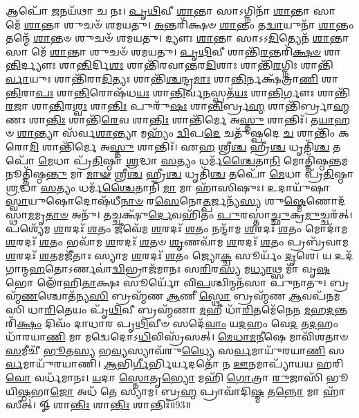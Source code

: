 𑌆𑌪𑍋᳴ \ul{𑌜}\-𑌨𑌯᳴𑌥𑌾 𑌚 𑌨𑌃। 
\-\ul{𑌪𑍃}\-\-\ul{𑌥𑌿}\-𑌵𑍀 \ul{𑌶𑌾}\-𑌨𑍍𑌤𑌾 𑌸𑌾𑌽𑌗𑍍𑌨𑌿𑌨𑌾᳴ \ul{𑌶𑌾}\-𑌨𑍍𑌤𑌾 𑌸𑌾 𑌮𑍇᳴ \ul{𑌶𑌾}\-𑌨𑍍𑌤𑌾 𑌶𑍁𑌚𑍞᳴ 𑌶𑌮𑌯𑌤𑍁। 
\-\ul{𑌅}\-𑌨𑍍𑌤𑌰𑌿᳴𑌕𑍍𑌷𑍞 \ul{𑌶𑌾}\-𑌨𑍍𑌤𑌂 𑌤\-\ul{𑌦𑍍𑌵𑌾}\-𑌯𑍁𑌨𑌾᳴ \ul{𑌶𑌾}\-𑌨𑍍𑌤𑌂 𑌤𑌨𑍍𑌮𑍇᳴ \ul{𑌶𑌾}\-𑌨𑍍𑌤𑍞 𑌶𑍁𑌚𑍞᳴ 𑌶𑌮𑌯𑌤𑍁। 
𑌦𑍍𑌯𑍗𑌃  \ul{𑌶𑌾}\-𑌨𑍍𑌤𑌾 𑌸𑌾𑌽𑌽\-\ul{𑌦𑌿}\-𑌤𑍍𑌯𑍇𑌨᳴ \ul{𑌶𑌾}\-𑌨𑍍𑌤𑌾 𑌸𑌾 𑌮𑍇᳴ \ul{𑌶𑌾}\-𑌨𑍍𑌤𑌾 𑌶𑍁𑌚𑍞᳴ 𑌶𑌮𑌯𑌤𑍁। 
\-\ul{𑌪𑍃}\-\-\ul{𑌥𑌿}\-𑌵𑍀 𑌶𑌾𑌨𑍍𑌤𑌿᳴\-\ul{𑌰}\-𑌨𑍍𑌤𑌰𑌿᳴\-\ul{𑌕𑍍𑌷}\-\-\ul{𑍞} 𑌶𑌾\-\ul{𑌨𑍍𑌤𑌿}\-𑌰𑍍𑌦𑍍𑌯𑍗𑌃  𑌶𑌾\-\ul{𑌨𑍍𑌤𑌿}\-𑌰𑍍𑌦𑌿\-\ul{𑌶𑌃} 𑌶𑌾𑌨𑍍𑌤𑌿᳴𑌰𑌵𑌾𑌨𑍍𑌤𑌰\-\ul{𑌦𑌿}\-𑌶𑌾𑌃  𑌶𑌾𑌨𑍍𑌤𑌿᳴\-\ul{𑌰}\-𑌗𑍍𑌨𑌿𑌃  𑌶𑌾𑌨𑍍𑌤𑌿᳴\-\ul{𑌰𑍍𑌵𑌾}\-𑌯𑍁𑌃  𑌶𑌾𑌨𑍍𑌤𑌿᳴𑌰𑌾\-\ul{𑌦𑌿}\-𑌤𑍍𑌯𑌃  𑌶𑌾𑌨𑍍𑌤𑌿᳴\-\ul{𑌶𑍍𑌚}\-𑌨𑍍𑌦𑍍𑌰\-\ul{𑌮𑌾𑌃} 𑌶𑌾\-\ul{𑌨𑍍𑌤𑌿}\-𑌰𑍍𑌨𑌕𑍍𑌷᳴𑌤𑍍𑌰𑌾\-\ul{𑌣𑌿} 𑌶𑌾\-\ul{𑌨𑍍𑌤𑌿}\-𑌰𑌾\-\ul{𑌪𑌃} 𑌶𑌾\-\ul{𑌨𑍍𑌤𑌿}\-𑌰𑍋𑌷᳴𑌧\-\ul{𑌯𑌃} 𑌶𑌾\-\ul{𑌨𑍍𑌤𑌿}\-𑌰𑍍𑌵\-\ul{𑌨}\-𑌸𑍍𑌪𑌤᳴\-\ul{𑌯𑌃} 𑌶𑌾\-\ul{𑌨𑍍𑌤𑌿}\-𑌰𑍍𑌗𑍗𑌃  𑌶𑌾𑌨𑍍𑌤𑌿᳴\-\ul{𑌰}\-𑌜𑌾 𑌶𑌾\-\ul{𑌨𑍍𑌤𑌿}\-𑌰\-\ul{𑌶𑍍𑌵𑌃} 𑌶𑌾\-\ul{𑌨𑍍𑌤𑌿𑌃} 𑌪𑍁𑌰𑍁᳴\-\ul{𑌷𑌃} 𑌶𑌾\-\ul{𑌨𑍍𑌤𑌿}\-𑌰𑍍𑌬𑍍𑌰\-\ul{𑌹𑍍𑌮} 𑌶𑌾𑌨𑍍𑌤𑌿᳴𑌰𑍍𑌬𑍍𑌰𑌾\-\ul{𑌹𑍍𑌮}\-𑌣𑌃  𑌶𑌾\-\ul{𑌨𑍍𑌤𑌿𑌃} 𑌶𑌾𑌨𑍍𑌤𑌿᳴\-\ul{𑌰𑍇}\-𑌵 𑌶𑌾\-\ul{𑌨𑍍𑌤𑌿𑌃} 𑌶𑌾𑌨𑍍𑌤𑌿᳴𑌰𑍍𑌮𑍇 𑌅\-\ul{𑌸𑍍𑌤𑍁} 𑌶𑌾𑌨𑍍𑌤𑌿𑌃᳴। 
𑌤\-\ul{𑌯𑌾}\-𑌹𑍞 \ul{𑌶𑌾}\-𑌨𑍍𑌤𑍍𑌯𑌾 𑌸᳴𑌰𑍍𑌵\-\ul{𑌶𑌾}\-𑌨𑍍𑌤𑍍𑌯𑌾 𑌮𑌹𑍍𑌯𑌂᳴ \ul{𑌦𑍍𑌵𑌿}\-𑌪\-\ul{𑌦𑍇} 𑌚𑌤𑍁᳴𑌷𑍍𑌪𑌦𑍇 \ul{𑌚} 𑌶𑌾𑌨𑍍𑌤𑌿𑌂᳴ 𑌕𑌰𑍋\-\ul{𑌮𑌿} 𑌶𑌾𑌨𑍍𑌤𑌿᳴𑌰𑍍𑌮𑍇 𑌅\-\ul{𑌸𑍍𑌤𑍁} 𑌶𑌾𑌨𑍍𑌤𑌿𑌃᳴। 
𑌏\-\ul{𑌹} 𑌶𑍍𑌰𑍀\-\ul{𑌶𑍍𑌚} 𑌹𑍍𑌰𑍀\-\ul{𑌶𑍍𑌚} 𑌧𑍃𑌤𑌿᳴\-\ul{𑌶𑍍𑌚} 𑌤𑌪𑍋᳴ \ul{𑌮𑍇}\-𑌧𑌾 𑌪𑍍𑌰᳴\-\ul{𑌤𑌿}\-𑌷𑍍𑌠𑌾 \ul{𑌶𑍍𑌰}\-𑌦𑍍𑌧𑌾 \ul{𑌸}\-𑌤𑍍𑌯𑌂 𑌧𑌰𑍍𑌮᳴\-\ul{𑌶𑍍𑌚𑍈}\-𑌤𑌾\-\ul{𑌨𑌿} 𑌮𑍋𑌤𑍍𑌤𑌿᳴𑌷𑍍𑌠\-\ul{𑌨𑍍𑌤}\-𑌮𑌨𑍂𑌤𑍍𑌤𑌿᳴𑌷𑍍𑌠\-\ul{𑌨𑍍𑌤𑍁} 𑌮𑌾 \ul{𑌮𑌾}\-\-\ul{𑍟} 𑌶𑍍𑌰𑍀\-\ul{𑌶𑍍𑌚} 𑌹𑍍𑌰𑍀\-\ul{𑌶𑍍𑌚} 𑌧𑍃𑌤𑌿᳴\-\ul{𑌶𑍍𑌚} 𑌤𑌪𑍋᳴ \ul{𑌮𑍇}\-𑌧𑌾 𑌪𑍍𑌰᳴\-\ul{𑌤𑌿}\-𑌷𑍍𑌠𑌾 \ul{𑌶𑍍𑌰}\-𑌦𑍍𑌧𑌾 \ul{𑌸}\-𑌤𑍍𑌯𑌂 𑌧𑌰𑍍𑌮᳴\-\ul{𑌶𑍍𑌚𑍈}\-𑌤𑌾𑌨𑌿᳴ \ul{𑌮𑌾} 𑌮𑌾 𑌹𑌾᳴𑌸𑌿𑌷𑍁𑌃। 
𑌉𑌦𑌾𑌯𑍁᳴𑌷𑌾 \ul{𑌸𑍍𑌵𑌾}\-𑌯𑍁𑌷𑍋𑌦𑍋𑌷᳴𑌧𑍀\-\ul{𑌨𑌾}\-\-\ul{𑍞} 𑌰\-\ul{𑌸𑍇}\-𑌨𑍋\-\ul{𑌤𑍍𑌪}\-𑌰𑍍𑌜𑌨𑍍𑌯᳴\-\ul{𑌸𑍍𑌯} 𑌶𑍁\-\ul{𑌷𑍍𑌮𑍇}\-𑌣𑍋𑌦᳴𑌸𑍍𑌥𑌾\-\ul{𑌮}\-𑌮𑍃\-\ul{𑌤𑌾}\-\-\ul{𑍞} 𑌅𑌨𑍁᳴। 
𑌤𑌚𑍍𑌚𑌕𑍍𑌷𑍁᳴\-\ul{𑌰𑍍𑌦𑍇}\-𑌵𑌹𑌿᳴𑌤𑌂 \ul{𑌪𑍁}\-𑌰𑌸𑍍𑌤𑌾॑\-\ul{𑌚𑍍𑌛𑍁}\-𑌕𑍍𑌰\-\ul{𑌮𑍁}\-𑌚𑍍𑌚𑌰᳴𑌤𑍍। 
𑌪𑌶𑍍𑌯𑍇᳴𑌮 \ul{𑌶}\-𑌰𑌦𑌃᳴ \ul{𑌶}\-𑌤𑌂 𑌜𑍀𑌵𑍇᳴𑌮 \ul{𑌶}\-𑌰𑌦𑌃᳴ \ul{𑌶}\-𑌤𑌂 𑌨𑌨𑍍𑌦𑌾᳴𑌮 \ul{𑌶}\-𑌰𑌦𑌃᳴ \ul{𑌶}\-𑌤𑌂 𑌮𑍋𑌦𑌾᳴𑌮 \ul{𑌶}\-𑌰𑌦𑌃᳴ \ul{𑌶}\-𑌤𑌂 𑌭𑌵𑌾᳴𑌮 \ul{𑌶}\-𑌰𑌦𑌃᳴ \ul{𑌶}\-𑌤𑍞 \ul{𑌶𑍃}\-𑌣𑌵𑌾᳴𑌮 \ul{𑌶}\-𑌰𑌦𑌃᳴ \ul{𑌶}\-𑌤𑌂 𑌪𑍍𑌰𑌬𑍍𑌰᳴𑌵𑌾𑌮 \ul{𑌶}\-𑌰𑌦𑌃᳴ \ul{𑌶}\-𑌤𑌮𑌜𑍀᳴𑌤𑌾𑌃 𑌸𑍍𑌯𑌾𑌮 \ul{𑌶}\-𑌰𑌦𑌃᳴ \ul{𑌶}\-𑌤𑌂 𑌜𑍍𑌯𑍋\-\ul{𑌕𑍍𑌚} 𑌸𑍂𑌰𑍍𑌯𑌂᳴ \ul{𑌦𑍃}\-𑌶𑍇। 
𑌯 𑌉𑌦᳴𑌗𑌾𑌨𑍍𑌮\-\ul{𑌹}\-𑌤𑍋𑌽𑌰𑍍𑌣𑌵𑌾॑\-\ul{𑌦𑍍𑌵𑌿}\-𑌭𑍍𑌰𑌾𑌜᳴𑌮𑌾𑌨𑌃 𑌸\-\ul{𑌰𑌿}\-𑌰\-\ul{𑌸𑍍𑌯} 𑌮\-\ul{𑌧𑍍𑌯𑌾}\-𑌥𑍍𑌸 𑌮𑌾᳴ 𑌵𑍃\-\ul{𑌷}\-𑌭𑍋 𑌲𑍋᳴𑌹𑌿\-\ul{𑌤𑌾}\-𑌕𑍍𑌷𑌃 𑌸𑍂𑌰𑍍𑌯𑍋᳴ 𑌵𑌿\-\ul{𑌪}\-𑌶𑍍𑌚𑌿𑌨𑍍𑌮𑌨᳴𑌸𑌾 𑌪𑍁𑌨𑌾𑌤𑍁। 
𑌬𑍍𑌰𑌹𑍍𑌮᳴\-\ul{𑌣}\-𑌶𑍍𑌚𑍋𑌤᳴𑌨𑍍𑌯\-\ul{𑌸𑌿} 𑌬𑍍𑌰𑌹𑍍𑌮᳴𑌣 \ul{𑌆}\-𑌣𑍀 \ul{𑌸𑍍𑌥𑍋} 𑌬𑍍𑌰𑌹𑍍𑌮᳴𑌣 \ul{𑌆}\-𑌵𑌪᳴𑌨𑌮𑌸𑌿 𑌧𑌾\-\ul{𑌰𑌿}\-𑌤𑍇𑌯𑌂 𑌪𑍃᳴\-\ul{𑌥𑌿}\-𑌵𑍀 𑌬𑍍𑌰𑌹𑍍𑌮᳴𑌣𑌾 \ul{𑌮}\-𑌹𑍀 𑌧𑌾᳴\-\ul{𑌰𑌿}\-𑌤𑌮𑍇᳴𑌨𑍇𑌨 \ul{𑌮}\-𑌹\-\ul{𑌦}\-𑌨𑍍𑌤𑌰𑌿᳴\-\ul{𑌕𑍍𑌷𑌂} 𑌦𑌿𑌵𑌂᳴ 𑌦𑌾𑌧𑌾𑌰 𑌪𑍃\-\ul{𑌥𑌿}\-𑌵𑍀𑍞 𑌸𑌦𑍇᳴\-\ul{𑌵𑌾𑌂} 𑌯\-\ul{𑌦}\-𑌹𑌂 𑌵𑍇\-\ul{𑌦} 𑌤\-\ul{𑌦}\-𑌹𑌂 𑌧𑌾᳴𑌰𑌯𑌾\-\ul{𑌣𑌿} 𑌮𑌾 𑌮𑌦𑍍𑌵𑍇𑌦𑍋𑌽\-\ul{𑌧𑌿}\-𑌵𑌿𑌸𑍍𑌰᳴𑌸𑌤𑍍। 
\-\ul{𑌮𑍇}\-\-\ul{𑌧𑌾}\-\-\ul{𑌮}\-\-\ul{𑌨𑍀}\-𑌷𑍇 𑌮𑌾𑌵𑌿᳴𑌶𑌤𑌾𑍞 \ul{𑌸}\-𑌮𑍀𑌚𑍀᳴ \ul{𑌭𑍂}\-𑌤\-\ul{𑌸𑍍𑌯} 𑌭\-\ul{𑌵𑍍𑌯}\-𑌸𑍍𑌯𑌾𑌵᳴𑌰𑍁\-\ul{𑌧𑍍𑌯𑍈} 𑌸\-\ul{𑌰𑍍𑌵}\-𑌮𑌾𑌯𑍁᳴𑌰𑌯𑌾\-\ul{𑌣𑌿} 𑌸\-\ul{𑌰𑍍𑌵}\-𑌮𑌾𑌯𑍁᳴𑌰𑌯𑌾𑌣𑌿। 
\-\ul{𑌆}\-𑌭𑌿\-\ul{𑌰𑍍𑌗𑍀}\-𑌰𑍍𑌭𑌿𑌰𑍍𑌯𑌦𑌤𑍋᳴ 𑌨 \ul{𑌊}\-𑌨𑌮𑌾𑌪𑍍𑌯𑌾᳴𑌯𑌯 𑌹𑌰𑌿\-\ul{𑌵𑍋} 𑌵𑌰𑍍𑌧᳴𑌮𑌾𑌨𑌃। 
\-\ul{𑌯}\-𑌦𑌾 \ul{𑌸𑍍𑌤𑍋}\-𑌤𑍃\-\ul{𑌭𑍍𑌯𑍋} 𑌮𑌹𑌿᳴ \ul{𑌗𑍋}\-𑌤𑍍𑌰𑌾 \ul{𑌰𑍁}\-𑌜𑌾𑌸𑌿᳴ 𑌭𑍂𑌯𑌿\-\ul{𑌷𑍍𑌠}\-𑌭𑌾\-\ul{𑌜𑍋} 𑌅𑌧᳴ 𑌤𑍇 𑌸𑍍𑌯𑌾𑌮। 
𑌬𑍍𑌰\-\ul{𑌹𑍍𑌮} 𑌪𑍍𑌰𑌾𑌵𑌾᳴𑌦𑌿\-\ul{𑌷𑍍𑌮} 𑌤\-\ul{𑌨𑍍𑌨𑍋} 𑌮𑌾 𑌹𑌾᳴𑌸𑍀𑌤𑍍। 
𑍐 𑌶𑌾\-\ul{𑌨𑍍𑌤𑌿𑌃} 𑌶𑌾\-\ul{𑌨𑍍𑌤𑌿𑌃} 𑌶𑌾𑌨𑍍𑌤𑌿𑌃᳴॥93॥\anuvakamend[\-\ul{𑌪}\-\-\ul{𑌰𑌾}\-𑌵𑌤𑍋᳴ 𑌦𑌧𑌾𑌤𑍁 \ul{𑌬}\-𑌦𑍍𑌧𑌾𑌂 𑌜𑌿𑌨𑍍𑌵᳴𑌥 \ul{𑌦𑍃}\-𑌶𑍇 \ul{𑌸}\-𑌪𑍍𑌤 𑌚᳴]

